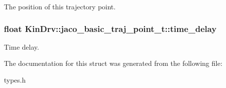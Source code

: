 The position of this trajectory point. \hypertarget{structKinDrv_1_1jaco__basic__traj__point__t_aee676deaacd7cdacdf832a9953e81605}{
\subsubsection[{time\+\_\+delay}]{\setlength{\rightskip}{0pt plus 5cm}float Kin\+Drv\+::jaco\+\_\+basic\+\_\+traj\+\_\+point\+\_\+t\+::time\+\_\+delay}}\label{structKinDrv_1_1jaco__basic__traj__point__t_aee676deaacd7cdacdf832a9953e81605}
Time delay. 

The documentation for this struct was generated from the following file\+:\begin{DoxyCompactItemize}
\item 
types.\+h\end{DoxyCompactItemize}
